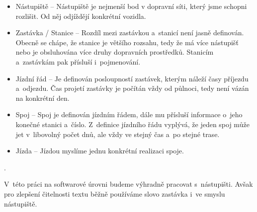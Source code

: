 \begin{itemize}

	\item Nástupiště -- Nástupiště je nejmenší bod v dopravní síti, který jsme schopni rozlišit. Od něj odjíždějí konkrétní vozidla.

	\item Zastávka / Stanice -- Rozdíl mezi zastávkou a~stanicí není jasně definován. Obecně se chápe, že stanice je většího rozsahu, tedy že má více nástupišť nebo je obsluhována více druhy dopravních prostředků. Stanicím a~zastávkám pak přísluší i~pojmenování.

	\item Jízdní řád -- Je definován posloupností zastávek, kterým náleží časy příjezdu a~odjezdu. Čas projetí zastávky je počítán vždy od půlnoci, tedy není vázán na konkrétní den.

	\item Spoj -- Spoj je definován jízdním řádem, dále mu přísluší informace o~jeho konečné stanici a~číslo. Z~definice jízdního řádu vyplývá, že jeden spoj může jet v~libovolný počet dnů, ale vždy ve stejný čas a~po stejné trase.

	\item Jízda -- Jízdou myslíme jednu konkrétní realizaci spoje.

\end{itemize}.

V~této práci na softwarové úrovni budeme výhradně pracovat s~nástupišti. Avšak pro zlepšení čitelnosti textu běžně používáme slovo zastávka i~ve smyslu nástupiště.
